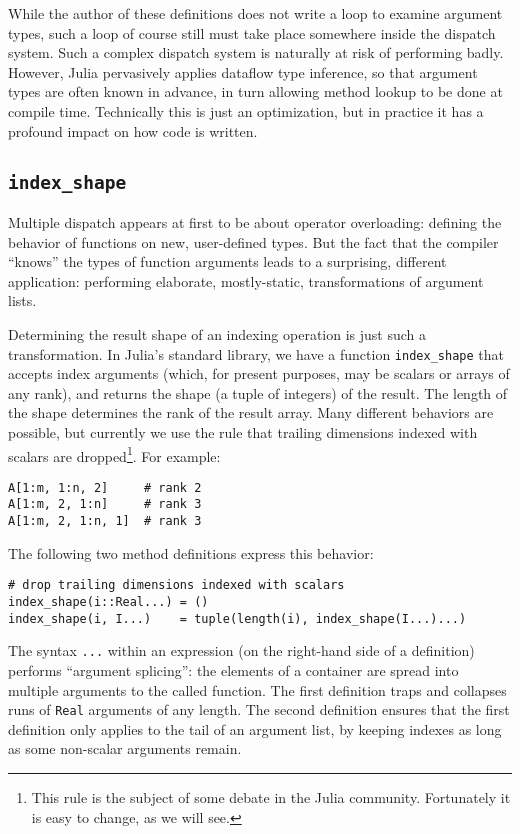 \documentclass[preprint]{sigplanconf}
\newcommand{\code}[1]{\texttt{#1}}
\begin{document}
While the author of these definitions does not write a loop to examine
argument types, such a loop of course still must take place somewhere inside
the dispatch system. Such a complex dispatch system is naturally at risk of
performing badly. However, Julia pervasively applies dataflow type
inference, so that argument types are often known in advance, in turn
allowing method lookup to be done at compile time. Technically this is
just an optimization, but in practice it has a profound impact on how code
is written.

\subsection{\texttt{index\_shape}}

Multiple dispatch appears at first to be about operator overloading:
defining the behavior of functions on new, user-defined types.
But the fact that the compiler ``knows'' the types of function arguments leads
to a surprising, different application: performing elaborate, mostly-static,
transformations of argument lists.

Determining the result shape of an indexing operation is just such a
transformation. In Julia's standard library, we have a function
\texttt{index\_shape} that accepts index arguments (which, for present
purposes, may be scalars or arrays of any rank), and returns the
shape (a tuple of integers) of the result. The length of the shape
determines the rank of the result array. Many different behaviors
are possible, but currently we use the rule that trailing dimensions
indexed with scalars are dropped\footnote{This rule is the subject of
some debate in the Julia community. Fortunately it is easy to change,
as we will see.}.
For example:

\begin{verbatim}
A[1:m, 1:n, 2]     # rank 2
A[1:m, 2, 1:n]     # rank 3
A[1:m, 2, 1:n, 1]  # rank 3
\end{verbatim}

The following two method definitions express this behavior:

{\small
\begin{verbatim}
# drop trailing dimensions indexed with scalars
index_shape(i::Real...) = ()
index_shape(i, I...)    = tuple(length(i), index_shape(I...)...)
\end{verbatim}
}

The syntax \code{...} within an expression (on the right-hand side of
a definition) performs ``argument splicing'': the elements of a container
are spread into multiple arguments to the called function.
The first definition traps and collapses runs of \code{Real} arguments of
any length. The second definition ensures that the first definition only
applies to the tail of an argument list, by keeping indexes as long as
some non-scalar arguments remain.
\end{document}
